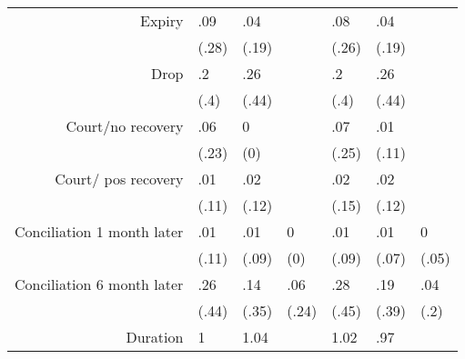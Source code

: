 \begin{tabular}{rrrrrrr}
Expiry & \multicolumn{1}{l}{.09} & \multicolumn{1}{l}{.04} & \multicolumn{1}{l}{} & \multicolumn{1}{l}{.08} & \multicolumn{1}{l}{.04} & \multicolumn{1}{l}{} \\
      & \multicolumn{1}{l}{(.28)} & \multicolumn{1}{l}{(.19)} & \multicolumn{1}{l}{} & \multicolumn{1}{l}{(.26)} & \multicolumn{1}{l}{(.19)} & \multicolumn{1}{l}{} \\
Drop  & \multicolumn{1}{l}{.2} & \multicolumn{1}{l}{.26} & \multicolumn{1}{l}{} & \multicolumn{1}{l}{.2} & \multicolumn{1}{l}{.26} & \multicolumn{1}{l}{} \\
      & \multicolumn{1}{l}{(.4)} & \multicolumn{1}{l}{(.44)} & \multicolumn{1}{l}{} & \multicolumn{1}{l}{(.4)} & \multicolumn{1}{l}{(.44)} & \multicolumn{1}{l}{} \\
Court/no recovery & \multicolumn{1}{l}{.06} & \multicolumn{1}{l}{0} & \multicolumn{1}{l}{} & \multicolumn{1}{l}{.07} & \multicolumn{1}{l}{.01} & \multicolumn{1}{l}{} \\
      & \multicolumn{1}{l}{(.23)} & \multicolumn{1}{l}{(0)} & \multicolumn{1}{l}{} & \multicolumn{1}{l}{(.25)} & \multicolumn{1}{l}{(.11)} & \multicolumn{1}{l}{} \\
Court/ pos recovery & \multicolumn{1}{l}{.01} & \multicolumn{1}{l}{.02} & \multicolumn{1}{l}{} & \multicolumn{1}{l}{.02} & \multicolumn{1}{l}{.02} & \multicolumn{1}{l}{} \\
      & \multicolumn{1}{l}{(.11)} & \multicolumn{1}{l}{(.12)} & \multicolumn{1}{l}{} & \multicolumn{1}{l}{(.15)} & \multicolumn{1}{l}{(.12)} & \multicolumn{1}{l}{} \\
Conciliation 1 month later & \multicolumn{1}{l}{.01} & \multicolumn{1}{l}{.01} & \multicolumn{1}{l}{0} & \multicolumn{1}{l}{.01} & \multicolumn{1}{l}{.01} & \multicolumn{1}{l}{0} \\
      & \multicolumn{1}{l}{(.11)} & \multicolumn{1}{l}{(.09)} & \multicolumn{1}{l}{(0)} & \multicolumn{1}{l}{(.09)} & \multicolumn{1}{l}{(.07)} & \multicolumn{1}{l}{(.05)} \\
Conciliation 6 month later & \multicolumn{1}{l}{.26} & \multicolumn{1}{l}{.14} & \multicolumn{1}{l}{.06} & \multicolumn{1}{l}{.28} & \multicolumn{1}{l}{.19} & \multicolumn{1}{l}{.04} \\
      & \multicolumn{1}{l}{(.44)} & \multicolumn{1}{l}{(.35)} & \multicolumn{1}{l}{(.24)} & \multicolumn{1}{l}{(.45)} & \multicolumn{1}{l}{(.39)} & \multicolumn{1}{l}{(.2)} \\
Duration & \multicolumn{1}{l}{1} & \multicolumn{1}{l}{1.04} & \multicolumn{1}{l}{} & \multicolumn{1}{l}{1.02} & \multicolumn{1}{l}{.97} & \multicolumn{1}{l}{} \\

\end{tabular}
